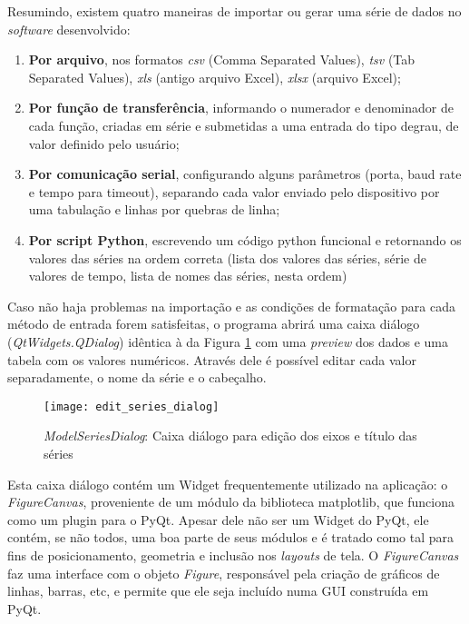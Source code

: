 Resumindo, existem quatro maneiras de importar ou gerar uma série de dados no \emph{software} desenvolvido:

\begin{enumerate}
	\item \textbf{Por arquivo}, nos formatos \emph{csv} (Comma Separated Values), \emph{tsv} (Tab Separated Values), \emph{xls} (antigo arquivo Excel), \emph{xlsx} (arquivo Excel);
	\item \textbf{Por função de transferência}, informando o numerador e denominador de cada função, criadas em série e submetidas a uma entrada do tipo degrau, de valor definido pelo usuário;
	\item \textbf{Por comunicação serial}, configurando alguns parâmetros (porta, baud rate e tempo para timeout), separando cada valor enviado pelo dispositivo por uma tabulação e linhas por quebras de linha;
	\item \textbf{Por script Python}, escrevendo um código python funcional e retornando os valores das séries na ordem correta (lista dos valores das séries, série de valores de tempo, lista de nomes das séries, nesta ordem)
\end{enumerate}

Caso não haja problemas na importação e as condições de formatação para cada método de entrada forem satisfeitas, o programa abrirá uma caixa diálogo (\emph{QtWidgets.QDialog}) idêntica à da Figura \ref{img_edit_series_dialog} com uma \textit{preview} dos dados e uma tabela com os valores numéricos. Através dele é possível editar cada valor separadamente, o nome da série e o cabeçalho.

\begin{figure}[hbt]
	\centering
	\caption{\emph{ModelSeriesDialog}: Caixa diálogo para edição dos eixos e título das séries}
	\texttt{[image: edit\_series\_dialog]}
	\label{img_edit_series_dialog}
\end{figure}

Esta caixa diálogo contém um Widget frequentemente utilizado na aplicação: o \emph{FigureCanvas}, proveniente de um módulo da biblioteca matplotlib, que funciona como um plugin para o PyQt. Apesar dele não ser um Widget do PyQt, ele contém, se não todos, uma boa parte de seus módulos e é tratado como tal para fins de posicionamento, geometria e inclusão nos \textit{layouts} de tela. O \emph{FigureCanvas} faz uma interface com o objeto \emph{Figure}, responsável pela criação de gráficos de linhas, barras, etc, e permite que ele seja incluído numa GUI construída em PyQt.

